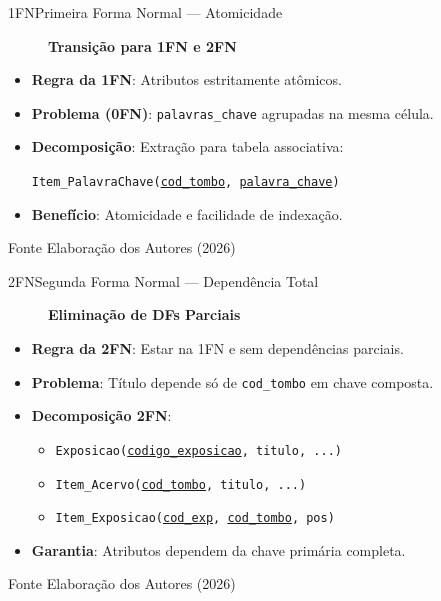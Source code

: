 \documentclass[10pt,aspectratio=169]{beamer}
\begin{document}
\begin{frame}{1FN}{Primeira Forma Normal --- Atomicidade}
  \begin{figure}
    \centering
    \textbf{Transição para 1FN e 2FN}
  \end{figure}
  \vspace{0.3cm}
  \begin{itemize}
    \item \textbf{Regra da 1FN}: Atributos estritamente atômicos.
    \item \textbf{Problema (0FN)}: \texttt{palavras\_chave} agrupadas na mesma célula.
    \item \textbf{Decomposição}: Extração para tabela associativa:
    \begin{center}
      \texttt{Item\_PalavraChave(\underline{cod\_tombo}, \underline{palavra\_chave})}
    \end{center}
    \item \textbf{Benefício}: Atomicidade e facilidade de indexação.
  \end{itemize}
  \vspace{0.2cm}
  \begin{block}{Fonte}
    Elaboração dos Autores (2026)
  \end{block}
\end{frame}

\begin{frame}{2FN}{Segunda Forma Normal --- Dependência Total}
  \begin{figure}
    \centering
    \textbf{Eliminação de DFs Parciais}
  \end{figure}
  \vspace{0.3cm}
  \begin{itemize}
    \item \textbf{Regra da 2FN}: Estar na 1FN e sem dependências parciais.
    \item \textbf{Problema}: Título depende só de \texttt{cod\_tombo} em chave composta.
    \item \textbf{Decomposição 2FN}:
    \begin{itemize}
      \item \texttt{Exposicao(\underline{codigo\_exposicao}, titulo, ...)}
      \item \texttt{Item\_Acervo(\underline{cod\_tombo}, titulo, ...)}
      \item \texttt{Item\_Exposicao(\underline{cod\_exp}, \underline{cod\_tombo}, pos)}
    \end{itemize}
    \item \textbf{Garantia}: Atributos dependem da chave primária completa.
  \end{itemize}
  \vspace{0.2cm}
  \begin{block}{Fonte}
    Elaboração dos Autores (2026)
  \end{block}
\end{frame}
\end{document}
